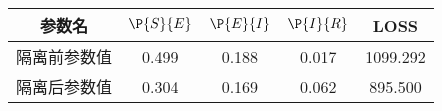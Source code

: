 \begin{tabular}{ccccc}
\hline
参数名&$\P{S}{E}$&$\P{E}{I}$&$\P{I}{R}$&LOSS\\
\hline
隔离前参数值&0.499&0.188&0.017&1099.292\\
隔离后参数值&0.304&0.169&0.062&895.500\\
\hline
\end{tabular}